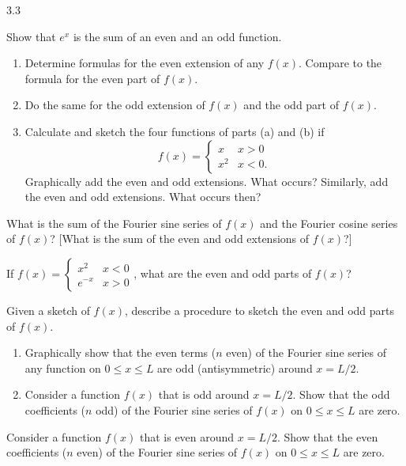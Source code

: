 \begin{exercises}{3.3}
\item Show that $e^x$ is the sum of an even and an odd function.

\item
\begin{enumerate}
\item[\textbf{(a)}] Determine formulas for the even extension of any $f(x)$.  Compare to the formula for the even part of $f(x)$.
\item[\textbf{(b)}] Do the same for the odd extension of $f(x)$ and the odd part of $f(x)$.
\item[\textbf{(c)}] Calculate and sketch the four functions of parts (a) and (b) if
\[
f(x) = \begin{cases} x & x > 0 \\ x^2 & x < 0. \end{cases}
\]
Graphically add the even and odd extensions.  What occurs?  Similarly, add the even and odd extensions.  What occurs then?
\end{enumerate}

\item What is the sum of the Fourier sine series of $f(x)$ and the Fourier cosine series of $f(x)$?  [What is the sum of the even and odd extensions of $f(x)$?]

\item[\starred 3.3.10.] If $f(x) = \begin{cases} x^2 & x < 0 \\ e^{-x} & x > 0 \end{cases}$, what are the even and odd parts of $f(x)$?

\item Given a sketch of $f(x)$, describe a procedure to sketch the even and odd parts of $f(x)$.

\item
\begin{enumerate}
\item[\textbf{(a)}] Graphically show that the even terms ($n$ even) of the Fourier sine series of any function on $0 \le x \le L$ are odd (antisymmetric) around $x = L/2$.
\item[\textbf{(b)}] Consider a function $f(x)$ that is odd around $x = L/2$.  Show that the odd coefficients ($n$ odd) of the Fourier sine series of $f(x)$ on $0 \le x \le L$ are zero.
\end{enumerate}

\item[\starred 3.3.13.] Consider a function $f(x)$ that is even around $x = L/2$.  Show that the even coefficients ($n$ even) of the Fourier sine series of $f(x)$ on $0 \le x \le L$ are zero.


\end{exercises}
